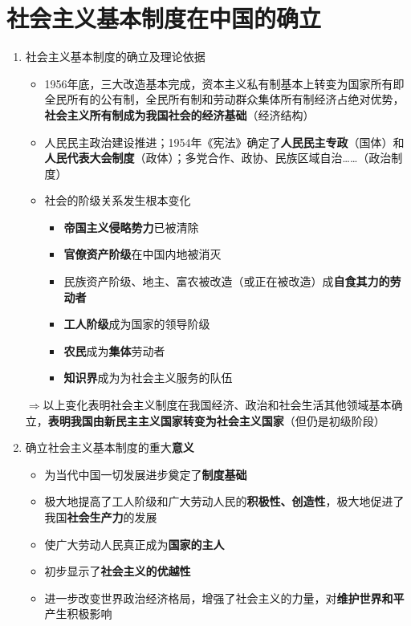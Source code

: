 \documentclass[12pt,openany]{ctexbook}
\begin{document}
\section{社会主义基本制度在中国的确立}
\begin{enumerate}
  \item 社会主义基本制度的确立及理论依据
\begin{itemize}
  \item 1956年底，三大改造基本完成，资本主义私有制基本上转变为国家所有即全民所有的公有制，全民所有制和劳动群众集体所有制经济占绝对优势，\textbf{社会主义所有制成为我国社会的经济基础}（经济结构）
  \item 人民民主政治建设推进；1954年《宪法》确定了\textbf{人民民主专政}（国体）和\textbf{人民代表大会制度}（政体）；多党合作、政协、民族区域自治……（政治制度）
  \item 社会的阶级关系发生根本变化
\begin{itemize}
  \item \textbf{帝国主义侵略势力}已被清除
  \item \textbf{官僚资产阶级}在中国内地被消灭
  \item 民族资产阶级、地主、富农被改造（或正在被改造）成\textbf{自食其力的劳动者}
  \item \textbf{工人阶级}成为国家的领导阶级
  \item \textbf{农民}成为\textbf{集体}劳动者
  \item \textbf{知识界}成为为社会主义服务的队伍
\end{itemize}
\end{itemize}
  \par $\Longrightarrow$以上变化表明社会主义制度在我国经济、政治和社会生活其他领域基本确立，\textbf{表明我国由新民主主义国家转变为社会主义国家}（但仍是初级阶段）
  \item 确立社会主义基本制度的重大\textbf{意义}
\begin{itemize}
  \item 为当代中国一切发展进步奠定了\textbf{制度基础}
  \item 极大地提高了工人阶级和广大劳动人民的\textbf{积极性、创造性}，极大地促进了我国\textbf{社会生产力}的发展
  \item 使广大劳动人民真正成为\textbf{国家的主人}
  \item 初步显示了\textbf{社会主义的优越性}
  \item 进一步改变世界政治经济格局，增强了社会主义的力量，对\textbf{维护世界和平}产生积极影响
\end{itemize}
\end{enumerate}
\end{document}
